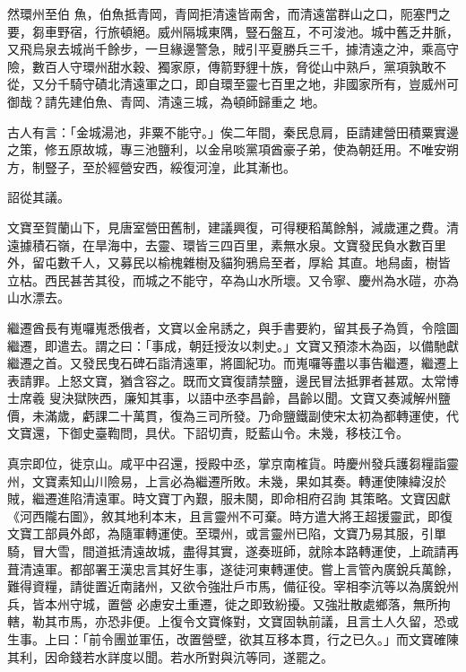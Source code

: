 \begin{pinyinscope}
 然環州至伯
 魚，伯魚抵青岡，青岡拒清遠皆兩舍，而清遠當群山之口，阨塞門之要，芻車野宿，行旅頓絕。威州隔城東隅，豎石盤互，不可浚池。城中舊乏井脈，又飛烏泉去城尚千餘步，一旦緣邊警急，賊引平夏勝兵三千，據清遠之沖，乘高守險，數百人守環州甜水穀、獨家原，傳箭野貍十族，脅從山中熟戶，黨項孰敢不從，又分千騎守磧北清遠軍之口，即自環至靈七百里之地，非國家所有，豈威州可御哉？請先建伯魚、青岡、清遠三城，為頓師歸重之
 地。



 古人有言：「金城湯池，非粟不能守。」俟二年間，秦民息肩，臣請建營田積粟實邊之策，修五原故城，專三池鹽利，以金帛啖黨項酋豪子弟，使為朝廷用。不唯安朔方，制豎子，至於經營安西，綏復河湟，此其漸也。



 詔從其議。



 文寶至賀蘭山下，見唐室營田舊制，建議興復，可得粳稻萬餘斛，減歲運之費。清遠據積石嶺，在旱海中，去靈、環皆三四百里，素無水泉。文寶發民負水數百里外，留屯數千人，又募民以榆槐雜樹及貓狗鴉烏至者，厚給
 其直。地舄鹵，樹皆立枯。西民甚苦其役，而城之不能守，卒為山水所壞。又令寧、慶州為水磑，亦為山水漂去。



 繼遷酋長有嵬囉嵬悉俄者，文寶以金帛誘之，與手書要約，留其長子為質，令陰圖繼遷，即遣去。謂之曰：「事成，朝廷授汝以刺史。」文寶又預漆木為函，以備馳獻繼遷之首。又發民曳石碑石詣清遠軍，將圖紀功。而嵬囉等盡以事告繼遷，繼遷上表請罪。上怒文寶，猶含容之。既而文寶復請禁鹽，邊民冒法抵罪者甚眾。太常博士席羲
 叟決獄陜西，廉知其事，以語中丞李昌齡，昌齡以聞。文寶又奏減解州鹽價，未滿歲，虧課二十萬貫，復為三司所發。乃命鹽鐵副使宋太初為都轉運使，代文寶還，下御史臺鞫問，具伏。下詔切責，貶藍山令。未幾，移枝江令。



 真宗即位，徙京山。咸平中召還，授殿中丞，掌京南榷貨。時慶州發兵護芻糧詣靈州，文寶素知山川險易，上言必為繼遷所敗。未幾，果如其奏。轉運使陳緯沒於賊，繼遷進陷清遠軍。時文寶丁內艱，服未闋，即命相府召詢
 其策略。文寶因獻《河西隴右圖》，敘其地利本末，且言靈州不可棄。時方遣大將王超援靈武，即復文寶工部員外郎，為隨軍轉運使。至環州，或言靈州已陷，文寶乃易其服，引單騎，冒大雪，間道抵清遠故城，盡得其實，遂奏班師，就除本路轉運使，上疏請再葺清遠軍。都部署王漢忠言其好生事，遂徒河東轉運使。嘗上言管內廣銳兵萬餘，難得資糧，請徙置近南諸州，又欲令強壯戶市馬，備征役。宰相李沆等以為廣銳州兵，皆本州守城，置營
 必慮安土重遷，徙之即致紛擾。又強壯散處鄉落，無所拘轄，勒其市馬，亦恐非便。上復令文寶條對，文寶固執前議，且言土人久留，恐或生事。上曰：「前令團並軍伍，改置營壁，欲其互移本貫，行之已久。」而文寶確陳其利，因命錢若水詳度以聞。若水所對與沆等同，遂罷之。




\end{pinyinscope}
